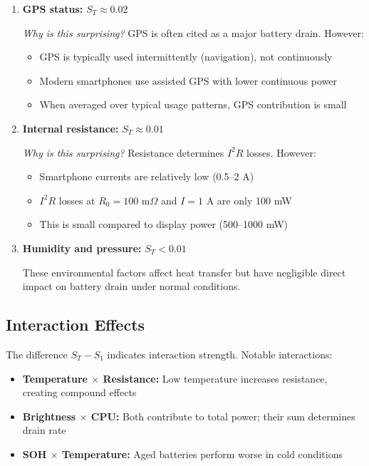 \begin{enumerate}
    \item \textbf{GPS status:} $S_T \approx 0.02$
    
    \textit{Why is this surprising?} GPS is often cited as a major battery drain. However:
    \begin{itemize}
        \item GPS is typically used intermittently (navigation), not continuously
        \item Modern smartphones use assisted GPS with lower continuous power
        \item When averaged over typical usage patterns, GPS contribution is small
    \end{itemize}
    
    \item \textbf{Internal resistance:} $S_T \approx 0.01$
    
    \textit{Why is this surprising?} Resistance determines $I^2R$ losses. However:
    \begin{itemize}
        \item Smartphone currents are relatively low (0.5--2 A)
        \item $I^2R$ losses at $R_0 = 100$ m$\Omega$ and $I = 1$ A are only 100 mW
        \item This is small compared to display power (500--1000 mW)
    \end{itemize}
    
    \item \textbf{Humidity and pressure:} $S_T < 0.01$
    
    These environmental factors affect heat transfer but have negligible direct impact on battery drain under normal conditions.
\end{enumerate}

\subsection{Interaction Effects}
\label{subsec:interactions}

The difference $S_T - S_1$ indicates interaction strength. Notable interactions:

\begin{itemize}
    \item \textbf{Temperature $\times$ Resistance:} Low temperature increases resistance, creating compound effects
    \item \textbf{Brightness $\times$ CPU:} Both contribute to total power; their sum determines drain rate
    \item \textbf{SOH $\times$ Temperature:} Aged batteries perform worse in cold conditions
\end{itemize}

